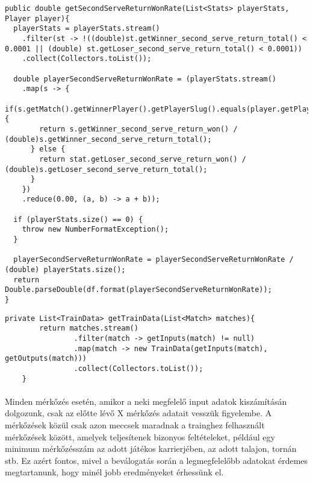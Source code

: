 \begin{lstlisting}[caption= A második szervák győzelmi rátája fogadóként]
public double getSecondServeReturnWonRate(List<Stats> playerStats, Player player){
  playerStats = playerStats.stream()
    .filter(st -> !((double)st.getWinner_second_serve_return_total() < 0.0001 || (double) st.getLoser_second_serve_return_total() < 0.0001))
    .collect(Collectors.toList());

  double playerSecondServeReturnWonRate = (playerStats.stream()
    .map(s -> {
      if(s.getMatch().getWinnerPlayer().getPlayerSlug().equals(player.getPlayerSlug())){
        return s.getWinner_second_serve_return_won() / (double)s.getWinner_second_serve_return_total();
      } else {
        return stat.getLoser_second_serve_return_won() / (double)s.getLoser_second_serve_return_total();
      }
    })
    .reduce(0.00, (a, b) -> a + b));

  if (playerStats.size() == 0) {
    throw new NumberFormatException();
  }

  playerSecondServeReturnWonRate = playerSecondServeReturnWonRate / (double) playerStats.size();
  return Double.parseDouble(df.format(playerSecondServeReturnWonRate));
}
\end{lstlisting}

\newpage

\begin{lstlisting}[caption= Az adatbázisban talált mérkőzések training adatokká való átalakítása]
    private List<TrainData> getTrainData(List<Match> matches){
        return matches.stream()
                .filter(match -> getInputs(match) != null)
                .map(match -> new TrainData(getInputs(match), getOutputs(match)))
                .collect(Collectors.toList());
    }
\end{lstlisting}

\paragraph{}
Minden mérkőzés esetén, amikor a neki megfelelő input adatok kiszámításán dolgozunk, csak az előtte lévő X mérkőzés adatait vesszük figyelembe. A mérkőzések közül csak azon meccsek maradnak a trainghez felhasznált mérkőzések között, amelyek teljesítenek bizonyos feltételeket, például egy minimum mérkőzésszám az adott játékos karrierjében, az adott talajon, tornán stb. Ez azért fontos, mivel a beválogatás során a legmegfelelőbb adatokat érdemes megtartanunk, hogy minél jobb eredményeket érhessünk el.

